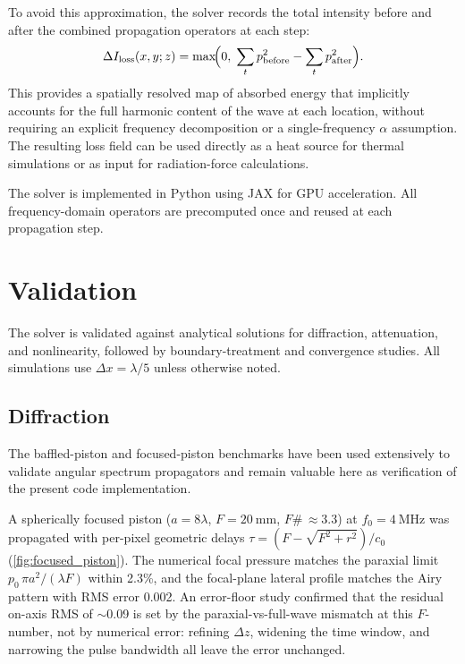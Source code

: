 \documentclass[11pt]{article}
\begin{document}
To avoid this approximation, the solver records the total intensity
before and after the combined propagation operators at each step:
\begin{equation}
  \Delta I_{\mathrm{loss}}(x,y;z) = \max\!\Bigl(0,\;
  \sum_t p_{\mathrm{before}}^2 - \sum_t p_{\mathrm{after}}^2\Bigr).
  \label{eq:loss}
\end{equation}
This provides a spatially resolved map of absorbed energy that
implicitly accounts for the full harmonic content of the wave at each
location, without requiring an explicit frequency decomposition or a
single-frequency $\alpha$ assumption.  The resulting loss field can be
used directly as a heat source for thermal simulations or as input
for radiation-force calculations.

The solver is implemented in Python using JAX \cite{jax2018} for GPU
acceleration.  All frequency-domain operators are precomputed once and
reused at each propagation step.

\section{Validation}
\label{sec:validation}

The solver is validated against analytical solutions for diffraction,
attenuation, and nonlinearity, followed by boundary-treatment and
convergence studies.  All simulations use $\Delta x = \lambda/5$
unless otherwise noted.

\subsection{Diffraction}
\label{sec:val_diffraction}

The baffled-piston and focused-piston benchmarks have been used
extensively to validate angular spectrum propagators
\cite{christopher1991,zemp2010,du1985} and remain valuable here as
verification of the present code implementation.

A spherically focused piston ($a = 8\lambda$,
$F = \SI{20}{\milli\meter}$, $F\#\,\approx 3.3$) at
$f_0 = \SI{4}{\MHz}$ was propagated with per-pixel geometric delays
$\tau = (F - \sqrt{F^2 + r^2})/c_0$ (\cref{fig:focused_piston}).
The numerical focal pressure matches the paraxial limit
$p_0\,\pi a^2/(\lambda F)$ within 2.3\%, and the focal-plane
lateral profile matches the Airy pattern with RMS error 0.002.
An error-floor study confirmed that the residual on-axis RMS of
$\sim$0.09 is set by the paraxial-vs-full-wave mismatch at this
$F$-number, not by numerical error: refining $\Delta z$, widening
the time window, and narrowing the pulse bandwidth all leave the
error unchanged.
\end{document}

